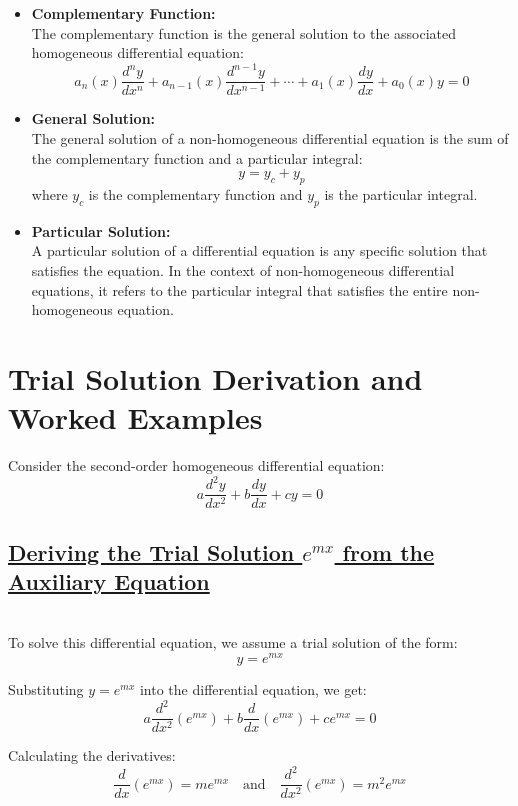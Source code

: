 \documentclass[a4paper,12pt]{article}
\begin{document}
\begin{itemize}
\item \textbf{Complementary Function:}\\
The complementary function is the general solution to the associated homogeneous differential equation:
\[
a_n(x) \frac{d^n y}{dx^n} + a_{n-1}(x) \frac{d^{n-1} y}{dx^{n-1}} + \cdots + a_1(x) \frac{dy}{dx} + a_0(x) y = 0
\]

\item \textbf{General Solution:}\\
The general solution of a non-homogeneous differential equation is the sum of the complementary function and a particular integral:
\[
y = y_c + y_p
\]
where \( y_c \) is the complementary function and \( y_p \) is the particular integral.

\item \textbf{Particular Solution:}\\
A particular solution of a differential equation is any specific solution that satisfies the equation. In the context of non-homogeneous differential equations, it refers to the particular integral that satisfies the entire non-homogeneous equation.

\end{itemize}
\section{Trial Solution Derivation and Worked Examples}

Consider the second-order homogeneous differential equation:
\[
a \frac{d^2y}{dx^2} + b \frac{dy}{dx} + c y = 0
\]

\subsection*{\underline{Deriving the Trial Solution \(e^{mx}\) from the Auxiliary Equation}}\\

To solve this differential equation, we assume a trial solution of the form:
\[
y = e^{mx}
\]

Substituting \(y = e^{mx}\) into the differential equation, we get:
\[
a \frac{d^2}{dx^2}(e^{mx}) + b \frac{d}{dx}(e^{mx}) + c e^{mx} = 0
\]

Calculating the derivatives:
\[
\frac{d}{dx}(e^{mx}) = me^{mx} \quad \text{and} \quad \frac{d^2}{dx^2}(e^{mx}) = m^2 e^{mx}
\]
\end{document}
